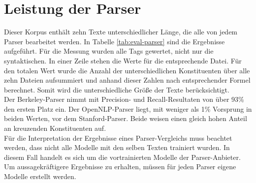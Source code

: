 \section{Leistung der Parser}
Dieser Korpus enthält zehn Texte unterschiedlicher Länge, die alle von jedem Parser bearbeitet werden. In Tabelle \ref{tab:eval-parser} sind die Ergebnisse aufgeführt. Für die Messung wurden alle Tags gewertet, nicht nur die syntaktischen. In einer Zeile stehen die Werte für die entsprechende Datei. Für den totalen Wert wurde die Anzahl der unterschiedlichen Konstituenten über alle zehn Dateien aufsummiert und anhand dieser Zahlen nach entsprechender Formel berechnet. Somit wird die unterschiedliche Größe der Texte berücksichtigt. \\
Der Berkeley-Parser nimmt mit Precision- und Recall-Resultaten von über 93\% den ersten Platz ein. Der OpenNLP-Parser liegt, mit weniger als 1\% Vorsprung in beiden Werten, vor dem Stanford-Parser. Beide weisen einen gleich hohen Anteil an kreuzenden Konstituenten auf.\\
Für die Interpretation der Ergebnisse eines Parser-Vergleichs muss beachtet werden, dass nicht alle Modelle mit den selben Texten trainiert wurden. In diesem Fall handelt es sich um die vortrainierten Modelle der Parser-Anbieter. Um aussagekräftigere Ergebnisse zu erhalten, müssen für jeden Parser eigene Modelle erstellt werden. 
